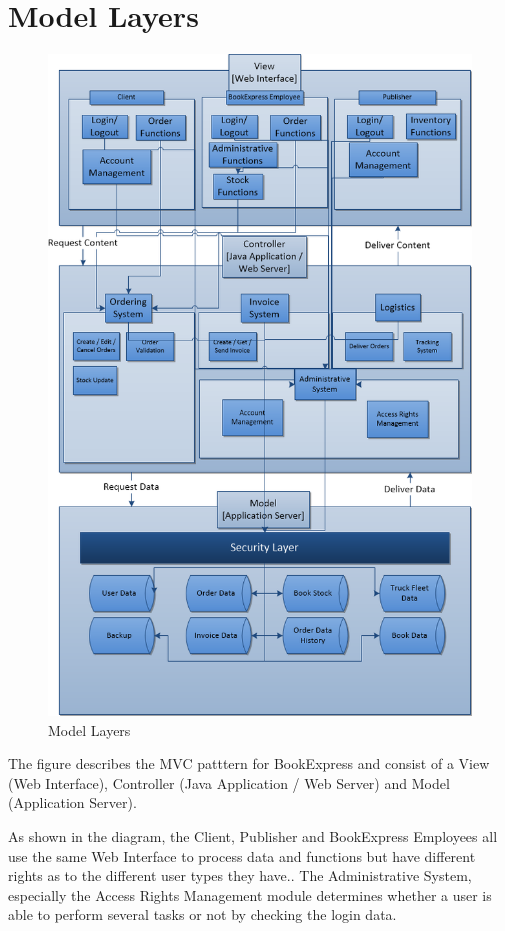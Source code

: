 \documentclass[11pt,a4paper,oneside,svgnames]{report}
\begin{document}
\section{Model Layers}
\begin{figure}[H]
 \begin{center}
  \includegraphics[width=\textwidth]{LayeredModel.png}
 \end{center}
 \caption{Model Layers}
\end{figure}

The figure describes the MVC patttern for BookExpress and consist of a View (Web Interface), Controller (Java Application / Web Server) and Model (Application Server).

As shown in the diagram, the Client, Publisher and BookExpress Employees all use the same Web Interface to process data and functions but have different rights as to the different user types they have.. 
The Administrative System, especially the Access Rights Management module determines whether a user is able to perform several tasks or not by checking the login data. 
\end{document}
